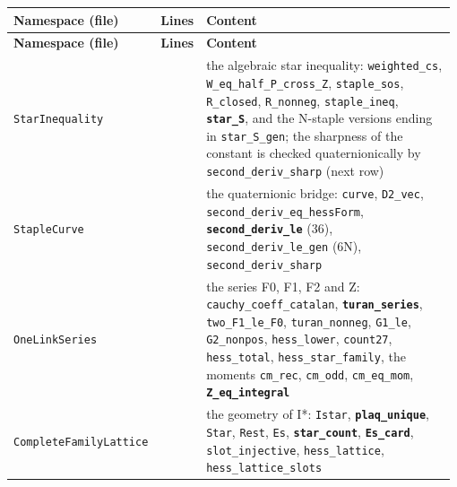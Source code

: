 \documentclass[11pt,a4paper]{article}
\theoremstyle{named}
\begin{document}
\begin{small}
\begin{longtable}{>{\raggedright\arraybackslash}p{0.331\linewidth}>{\raggedright\arraybackslash}p{0.05\linewidth}>{\raggedright\arraybackslash}p{0.596\linewidth}}
\hline
\textbf{Namespace (file)} & \textbf{Lines} & \textbf{Content} \\
\hline
\endfirsthead
\hline
\textbf{Namespace (file)} & \textbf{Lines} & \textbf{Content} \\
\hline
\endhead
\hline
\endfoot
\texttt{StarInequality} & 586 & the algebraic star inequality: \texttt{weighted\_\allowbreak{}cs}, \texttt{W\_\allowbreak{}eq\_\allowbreak{}half\_\allowbreak{}P\_\allowbreak{}cross\_\allowbreak{}Z}, \texttt{staple\_\allowbreak{}sos}, \texttt{R\_\allowbreak{}closed}, \texttt{R\_\allowbreak{}nonneg}, \texttt{staple\_\allowbreak{}ineq}, \textbf{\texttt{star\_\allowbreak{}S}}, and the N-staple versions ending in \texttt{star\_\allowbreak{}S\_\allowbreak{}gen}; the sharpness of the constant is checked quaternionically by \texttt{second\_\allowbreak{}deriv\_\allowbreak{}sharp} (next row) \\
\texttt{StapleCurve} & 394 & the quaternionic bridge: \texttt{curve}, \texttt{D2\_\allowbreak{}vec}, \texttt{second\_\allowbreak{}deriv\_\allowbreak{}eq\_\allowbreak{}hessForm}, \textbf{\texttt{second\_\allowbreak{}deriv\_\allowbreak{}le}} (36), \texttt{second\_\allowbreak{}deriv\_\allowbreak{}le\_\allowbreak{}gen} (6N), \texttt{second\_\allowbreak{}deriv\_\allowbreak{}sharp} \\
\texttt{OneLinkSeries} & 886 & the series F0, F1, F2 and Z: \texttt{cauchy\_\allowbreak{}coeff\_\allowbreak{}catalan}, \textbf{\texttt{turan\_\allowbreak{}series}}, \texttt{two\_\allowbreak{}F1\_\allowbreak{}le\_\allowbreak{}F0}, \texttt{turan\_\allowbreak{}nonneg}, \texttt{G1\_\allowbreak{}le}, \texttt{G2\_\allowbreak{}nonpos}, \texttt{hess\_\allowbreak{}lower}, \texttt{count27}, \texttt{hess\_\allowbreak{}total}, \texttt{hess\_\allowbreak{}star\_\allowbreak{}family}, the moments \texttt{cm\_\allowbreak{}rec}, \texttt{cm\_\allowbreak{}odd}, \texttt{cm\_\allowbreak{}eq\_\allowbreak{}mom}, \textbf{\texttt{Z\_\allowbreak{}eq\_\allowbreak{}integral}} \\
\texttt{CompleteFamilyLattice} & 609 & the geometry of I*: \texttt{Istar}, \textbf{\texttt{plaq\_\allowbreak{}unique}}, \texttt{Star}, \texttt{Rest}, \texttt{Es}, \textbf{\texttt{star\_\allowbreak{}count}}, \textbf{\texttt{Es\_\allowbreak{}card}}, \texttt{slot\_\allowbreak{}injective}, \texttt{hess\_\allowbreak{}lattice}, \texttt{hess\_\allowbreak{}lattice\_\allowbreak{}slots} \\

\end{longtable}
\end{small}
\end{document}
